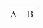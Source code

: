 \documentclass{article}
\begin{document}
\begin{tabularx}{\linewidth}{XX}
A & B
\end{tabularx}
\end{document}

